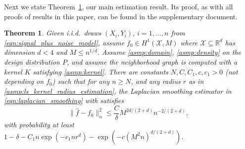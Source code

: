 \documentclass[twoside]{article}
\newcommand{\Reals}{\mathbb{R}}
\newcommand{\1}{\mathbf{1}}
\newcommand{\Rd}{\Reals^d}
\newcommand{\Xset}{\mathcal{X}}
\newcommand{\wh}[1]{\widehat{#1}}
\newtheorem{theorem}{Theorem}
\theoremstyle{definition}
\theoremstyle{remark}
\begin{document}
Next we state Theorem~\ref{thm:laplacian_smoothing_estimation1}, our main estimation result. Its proof, as with all proofs of results in this paper, can be found in the supplementary document. 
\begin{theorem}
	\label{thm:laplacian_smoothing_estimation1}
	Given i.i.d.\ draws $(X_i,Y_i)$, $i=1,\ldots,n$ from \eqref{eqn:signal_plus_noise_model}, assume $f_0 \in H^1(\Xset,M)$ where $\Xset \subseteq \Rd$ has dimension $d < 4$ and $M \leq n^{1/d}$. Assume \ref{asmp:domain}, \ref{asmp:density} on the design distribution $P$, and assume the neighborhood graph  is computed with a kernel $K$ satisfying \ref{asmp:kernel}. There are constants $N,C,C_1,c,c_1>0$ (not depending on $f_0$) such that for any $n \geq N$, and any radius $r$ as in \ref{asmp:ls_kernel_radius_estimation}, the Laplacian smoothing estimator \smash{$\wh{f}$} in \eqref{eqn:laplacian_smoothing} with  satisfies
	\begin{equation*}
	\bigl\|\wh{f} - f_0\bigr\|_n^2 \leq \frac{C}{\delta} M^{2d/(2 + d)} n^{-2/(2 + d)},
	\end{equation*}
	with probability at least $1 - \delta -  C_1n\exp(-c_1nr^d) - \exp(-c (M^2n)^{d/(2 + d)})$.
\end{theorem}
\end{document}

